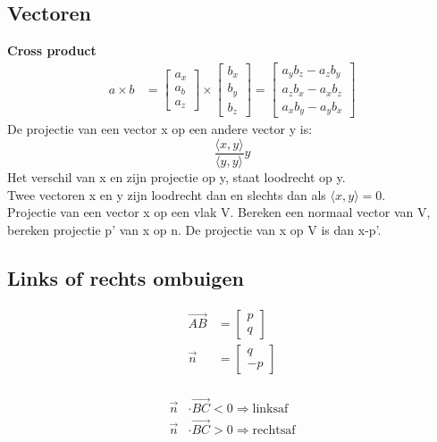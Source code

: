 \documentclass[a4paper, twocolumn]{article}
\renewcommand{\vec}{\overrightarrow}
\begin{document}
\subsection{Vectoren}
\textbf{Cross product}
\begin{align*}
a \times b &= \begin{bmatrix} a_x \\ a_b \\ a_z \end{bmatrix}
\times \begin{bmatrix} b_x \\ b_y \\ b_z \end{bmatrix} =
\begin{bmatrix} a_yb_z - a_zb_y \\ a_zb_x - a_xb_z \\ 
a_xb_y - a_yb_x \end{bmatrix}
\end{align*}
De projectie van een vector x op een andere vector y is:
$$\frac{\langle x,y \rangle}{\langle y,y \rangle} y$$
Het verschil van x en zijn projectie op y, staat loodrecht op y.\\
Twee vectoren x en y zijn loodrecht dan en slechts dan als $\langle x,y \rangle = 0$.\\

Projectie van een vector x op een vlak V. Bereken een normaal vector van V, bereken projectie p' van x op n. De projectie van x op V is dan x-p'.\\


\subsection*{Links of rechts ombuigen}\vspace{-0.5em}
\begin{minipage}{0.45\linewidth}
\end{minipage}
\begin{minipage}{0.25\linewidth}
	\begin{align*}
	\vec{AB} &= \begin{bmatrix} p \\ q \end{bmatrix} \\
	\vec{n} &= \begin{bmatrix} q \\ -p \end{bmatrix} \\
	\end{align*}
\end{minipage}%
\begin{minipage}{0.25\linewidth}
	\begin{align*}
	\vec{n} &\cdot \vec{BC} < 0 \Rightarrow \text{linksaf} \\
	\vec{n} &\cdot \vec{BC} > 0 \Rightarrow \text{rechtsaf}
	\end{align*}
\end{minipage}
\end{document}
